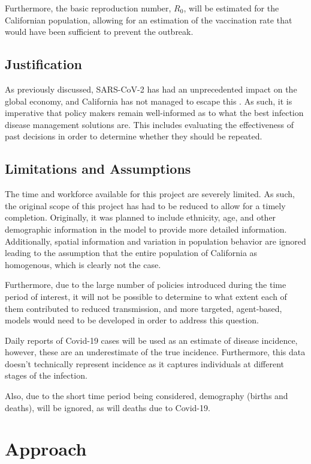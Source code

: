 \documentclass[11pt]{article}
\begin{document}
Furthermore,
the basic reproduction number, $R_0$, will be estimated for the Californian population, allowing for an estimation of the
vaccination rate that would have been sufficient to prevent the outbreak.

\subsection{Justification}
As previously discussed, SARS-CoV-2 has had an unprecedented impact on the global economy, and California has not managed to
escape this \cite{noauthor_economics_nodate}. As such, it is imperative that policy makers remain well-informed as to what
the best infection disease management solutions are.  This includes evaluating the effectiveness of past decisions in order
to determine whether they should be repeated.

\subsection{Limitations and Assumptions}
The time and workforce available for this project are severely limited. As such, the original scope of this project has had 
to be reduced to allow for a timely completion. Originally, it was planned to include ethnicity, age, and other demographic
information in the model to provide more detailed information.  Additionally, spatial information and variation in population
behavior are ignored leading to the assumption that the entire population of California as homogenous, which is clearly not the case.

Furthermore, due to the large number of policies introduced during the 
time period of interest, it will not be possible to determine to what extent each of them contributed to reduced 
transmission, and more targeted, agent-based, models would need to be developed in order to address this question.

Daily reports of Covid-19 cases will be used as an estimate of disease incidence, however, these are an underestimate of the
true incidence. Furthermore, this data doesn't technically represent incidence as it captures individuals at different stages
of the infection.

Also, due to the short time period being considered, demography (births and deaths), will be ignored, as will deaths due to
Covid-19.

\section{Approach}
\end{document}
